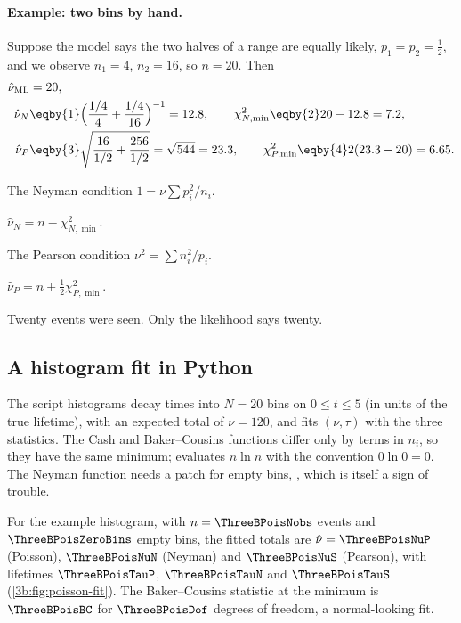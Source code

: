 \paragraph{Example: two bins by hand.}
Suppose the model says the two halves of a range are equally likely,
$p_1=p_2=\tfrac12$, and we observe $n_1=4$, $n_2=16$, so $n=20$. Then
\begin{align*}
  \hat\nu_{\text{ML}}&=20,\\
  \hat\nu_N&\eqby{1}\Bigl(\frac{1/4}{4}+\frac{1/4}{16}\Bigr)^{-1}=12.8,
  \qquad \chi^2_{N,\min}\eqby{2}20-12.8=7.2,\\
  \hat\nu_P&\eqby{3}\sqrt{\frac{16}{1/2}+\frac{256}{1/2}}=\sqrt{544}=23.3,
  \qquad \chi^2_{P,\min}\eqby{4}2(23.3-20)=6.65 .
\end{align*}
\begin{explain}
  \item The Neyman condition $1=\nu\sum p_i^2/n_i$.
  \item $\hat\nu_N=n-\chi^2_{N,\min}$.
  \item The Pearson condition $\nu^2=\sum n_i^2/p_i$.
  \item $\hat\nu_P=n+\tfrac12\chi^2_{P,\min}$.
\end{explain}
Twenty events were seen. Only the likelihood says twenty.

\subsection{A histogram fit in Python}
\label{3b:sec:poisson-python}

The script  histograms decay times into $N=20$
bins on $0\le t\le5$ (in units of the true lifetime), with an expected
total of $\nu=120$, and fits $(\nu,\tau)$ with the three statistics.
The Cash and Baker--Cousins functions differ only by terms in $n_i$, so
they have the same minimum;  evaluates
$n\ln n$ with the convention $0\ln0=0$. The Neyman function needs a patch
for empty bins, , which is itself a sign of
trouble.

For the example histogram, with $n=\ThreeBPoisNobs$ events and
$\ThreeBPoisZeroBins$ empty bins, the fitted totals are
$\hat\nu=\ThreeBPoisNuP$ (Poisson), $\ThreeBPoisNuN$ (Neyman) and
$\ThreeBPoisNuS$ (Pearson), with lifetimes $\ThreeBPoisTauP$,
$\ThreeBPoisTauN$ and $\ThreeBPoisTauS$ (\cref{3b:fig:poisson-fit}). The
Baker--Cousins statistic at the minimum is $\ThreeBPoisBC$ for
$\ThreeBPoisDof$ degrees of freedom, a normal-looking fit.

